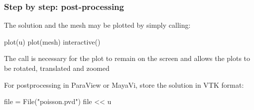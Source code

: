 \begin{frame}[fragile]
  \frametitle{Step by step: post-processing}

  The solution and the mesh may be plotted by simply calling:
  \vspace{-0.25cm}
  \begin{python}
plot(u)
plot(mesh)
interactive()
  \end{python}

  \bigskip

  The  call is necessary for the plot to remain on the
  screen and allows the plots to be rotated, translated and zoomed

  \bigskip

  For postprocessing in ParaView or MayaVi, store the solution in VTK
  format:
  \begin{python}
file = File("poisson.pvd")
file << u
  \end{python}

\end{frame}
